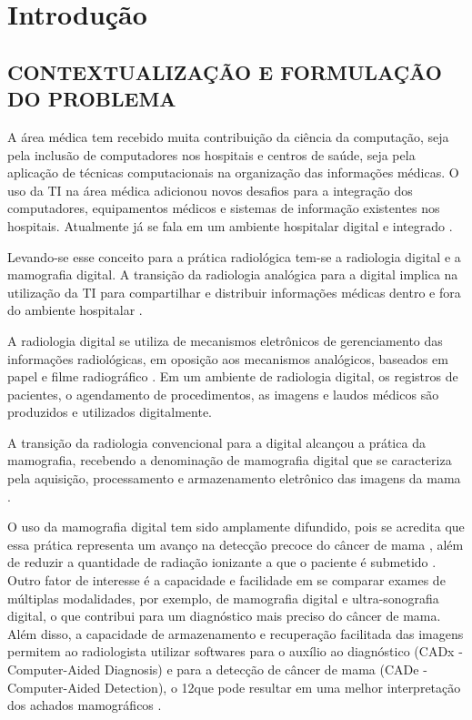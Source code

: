 \chapter[INTRODUÇÃO]{\textbf {Introdução}}
\section{CONTEXTUALIZAÇÃO E FORMULAÇÃO DO PROBLEMA}

A área médica tem recebido muita contribuição da ciência da computação, seja pela
inclusão de computadores nos hospitais e centros de saúde, seja pela aplicação de técnicas
computacionais na organização das informações médicas. O uso da TI na área médica
adicionou novos desafios para a integração dos computadores, equipamentos médicos e
sistemas de informação existentes nos hospitais. Atualmente já se fala em um ambiente
hospitalar digital e integrado \cite{huang}.

Levando-se esse conceito para a prática radiológica tem-se a radiologia digital e a
mamografia digital. A transição da radiologia analógica para a digital implica na utilização
da TI para compartilhar e distribuir informações médicas dentro e fora do ambiente
hospitalar \cite{huang}.

A radiologia digital se utiliza de mecanismos eletrônicos de gerenciamento das
informações radiológicas, em oposição aos mecanismos analógicos, baseados em papel e
filme radiográfico \cite{dreyer}. Em um ambiente de radiologia digital, os
registros de pacientes, o agendamento de procedimentos, as imagens e laudos médicos são
produzidos e utilizados digitalmente.

A transição da radiologia convencional para a digital alcançou a prática da
mamografia, recebendo a denominação de mamografia digital que se caracteriza pela
aquisição, processamento e armazenamento eletrônico das imagens da mama \cite{baert}.

O uso da mamografia digital tem sido amplamente difundido, pois se acredita que essa
prática representa um avanço na detecção precoce do câncer de mama \cite{trambert},
além de reduzir a quantidade de radiação ionizante a que o paciente é submetido \cite{huang}.
Outro fator de interesse é a capacidade e facilidade em se comparar
exames de múltiplas modalidades, por exemplo, de mamografia digital e ultra-sonografia
digital, o que contribui para um diagnóstico mais preciso do câncer de mama. Além disso,
a capacidade de armazenamento e recuperação facilitada das imagens permitem ao
radiologista utilizar softwares para o auxílio ao diagnóstico (CADx - Computer-Aided
Diagnosis) e para a detecção de câncer de mama (CADe - Computer-Aided Detection), o
12que pode resultar em uma melhor interpretação dos achados mamográficos \cite{baert}.

